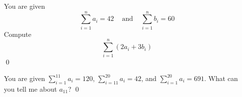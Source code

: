 \begin{ex}
You are given 
\[
\sum_{i = 1}^n a_i = 42 \,\,\,\,\, \text{ and } \,\,\,\,\, 
\sum_{i = 1}^n b_i = 60
\]
Compute
\[
\sum_{i = 1}^n (2a_i + 3b_i)
\]
\qed
\end{ex}


\begin{ex}
You are given $\sum_{i=1}^{11} a_i = 120$,
$\sum_{i=11}^{20} a_i = 42$, and $\sum_{i=1}^{20} a_i = 691$.
What can you tell me about $a_{11}$?
\qed
\end{ex}

